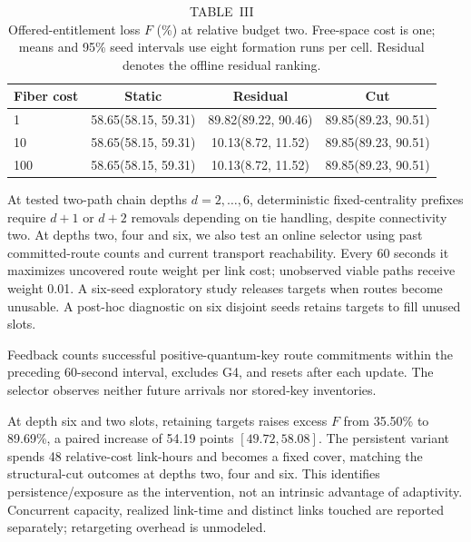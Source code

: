 \documentclass[conference,a4paper]{IEEEtran}
\newcommand{\OnlineRelease}{35.50}
\newcommand{\OnlinePersistent}{89.69}
\newcommand{\OnlinePersistenceGain}{54.19}
\newcommand{\OnlinePersistenceGainLo}{49.72}
\newcommand{\OnlinePersistenceGainHi}{58.08}
\begin{document}
\begin{table}[t]
\caption{TABLE~III\\ Offered-entitlement loss $F$ (\%) at relative budget two. Free-space cost is one; means and 95\% seed intervals use eight formation runs per cell. Residual denotes the offline residual ranking.}

\centering\footnotesize
\setlength{\tabcolsep}{2.5pt}
\begin{tabular}{@{}lccc@{}}
\toprule
Fiber cost & Static & Residual & Cut\\
\midrule
1 & {58.65\newline (58.15, 59.31)} & {89.82\newline (89.22, 90.46)} & {89.85\newline (89.23, 90.51)}\\[3pt]
10 & {58.65\newline (58.15, 59.31)} & {10.13\newline (8.72, 11.52)} & {89.85\newline (89.23, 90.51)}\\[3pt]
100 & {58.65\newline (58.15, 59.31)} & {10.13\newline (8.72, 11.52)} & {89.85\newline (89.23, 90.51)}\\[3pt]
\bottomrule
\end{tabular}

\end{table}

At tested two-path chain depths $d=2,\ldots,6$, deterministic fixed-centrality prefixes require $d+1$ or $d+2$ removals depending on tie handling, despite connectivity two. At depths two, four and six, we also test an online selector using past committed-route counts and current transport reachability. Every 60 seconds it maximizes uncovered route weight per link cost; unobserved viable paths receive weight 0.01. A six-seed exploratory study releases targets when routes become unusable. A post-hoc diagnostic on six disjoint seeds retains targets to fill unused slots.

Feedback counts successful positive-quantum-key route commitments within the preceding 60-second interval, excludes G4, and resets after each update. The selector observes neither future arrivals nor stored-key inventories.

At depth six and two slots, retaining targets raises excess $F$ from \OnlineRelease\% to \OnlinePersistent\%, a paired increase of \OnlinePersistenceGain{} points $[\OnlinePersistenceGainLo,\OnlinePersistenceGainHi]$. The persistent variant spends 48 relative-cost link-hours and becomes a fixed cover, matching the structural-cut outcomes at depths two, four and six. This identifies persistence/exposure as the intervention, not an intrinsic advantage of adaptivity. Concurrent capacity, realized link-time and distinct links touched are reported separately; retargeting overhead is unmodeled.
\end{document}
